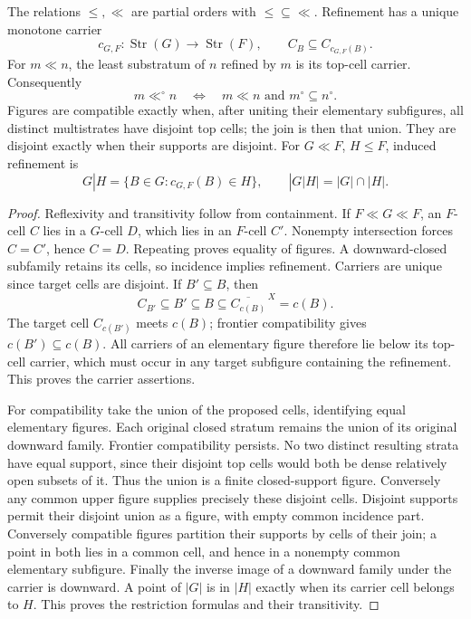 \begin{lemma}\label{SA21-BM-cell-calculus}
The relations \(\leq,\ll\) are partial orders with
\(\leq\subseteq\ll\). Refinement has a unique monotone carrier
\[
 c_{G,F}:\operatorname{Str}(G)\longrightarrow\operatorname{Str}(F),
 \qquad C_B\subseteq C_{c_{G,F}(B)}.
\]
For \(m\ll n\), the least substratum of \(n\) refined by
\(m\) is its top-cell carrier. Consequently
\[
 m\ll^\circ n\quad\Longleftrightarrow\quad
 m\ll n\text{ and }m^\circ\subseteq n^\circ.
\]
Figures are compatible exactly when, after uniting their
elementary subfigures, all distinct multistrates have disjoint
top cells; the join is then that union. They are disjoint
exactly when their supports are disjoint. For \(G\ll F\),
\(H\leq F\), induced refinement is
\[
 G|H=\{B\in G:c_{G,F}(B)\in H\},
 \qquad |G|H|=|G|\cap|H|.
\]
\end{lemma}

\begin{proof}
Reflexivity and transitivity follow from containment.
If \(F\ll G\ll F\), an \(F\)-cell \(C\) lies in a
\(G\)-cell \(D\), which lies in an \(F\)-cell \(C'\).
Nonempty intersection forces \(C=C'\), hence \(C=D\).
Repeating proves equality of figures. A downward-closed
subfamily retains its cells, so incidence implies refinement.
Carriers are unique since target cells are disjoint.
If \(B'\subseteq B\), then
\[
 C_{B'}\subseteq B'\subseteq B
 \subseteq\overline{C_{c(B)}}^{\,X}=c(B).
\]
The target cell \(C_{c(B')}\) meets \(c(B)\); frontier
compatibility gives \(c(B')\subseteq c(B)\). All carriers
of an elementary figure therefore lie below its top-cell
carrier, which must occur in any target subfigure containing
the refinement. This proves the carrier assertions.

For compatibility take the union of the proposed cells,
identifying equal elementary figures. Each original closed
stratum remains the union of its original downward family.
Frontier compatibility persists. No two distinct resulting
strata have equal support, since their disjoint top cells
would both be dense relatively open subsets of it.
Thus the union is a finite closed-support figure.
Conversely any common upper figure supplies precisely
these disjoint cells.
Disjoint supports permit their disjoint union as a figure,
with empty common incidence part. Conversely compatible
figures partition their supports by cells of their join;
a point in both lies in a common cell, and hence in a
nonempty common elementary subfigure.
Finally the inverse image of a downward family under
the carrier is downward. A point of \(|G|\) is in \(|H|\)
exactly when its carrier cell belongs to \(H\). This proves
the restriction formulas and their transitivity.
\end{proof}

